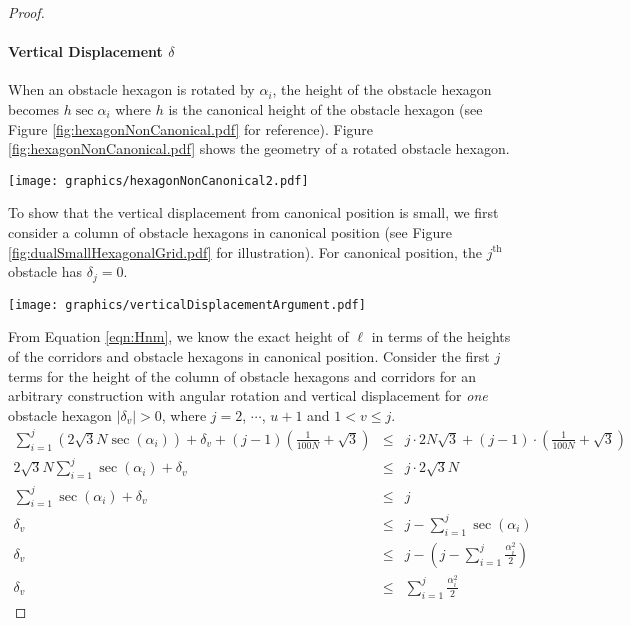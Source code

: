\documentclass[10pt]{CSUNthesis}
\theoremstyle{plain}%
\theoremstyle{definition}
\theoremstyle{remark}
\newcommand{\jth}{j^\text{th}}
\newcommand{\lr}[1]{\left( #1 \right)}
\begin{document}
\begin{proof}
\paragraph{Vertical Displacement $\delta$}

When an obstacle hexagon is rotated by $\alpha_i$, the height of the obstacle hexagon becomes $h \sec \alpha_i$ where $h$ is the canonical height of the obstacle hexagon (see Figure \ref{fig:hexagonNonCanonical.pdf} for reference).
Figure \ref{fig:hexagonNonCanonical.pdf} shows the geometry of a rotated obstacle hexagon.

\begin{minipage}{\linewidth}
\begin{center}
\texttt{[image: graphics/hexagonNonCanonical2.pdf]}
\label{fig:hexagonNonCanonical.pdf}
\end{center}
\end{minipage}

To show that the vertical displacement from canonical position is small, we first consider a column of obstacle hexagons in canonical position (see Figure \ref{fig:dualSmallHexagonalGrid.pdf} for illustration).  
For canonical position, the $\jth$ obstacle has $\delta_j = 0$.

\begin{minipage}{\linewidth}
\begin{center}
\texttt{[image: graphics/verticalDisplacementArgument.pdf]}
\label{fig:verticalDisplacementArgument.pdf}
\end{center}
\end{minipage}

From Equation \ref{eqn:Hnm}, we know the exact height of $\ell$ in terms of the heights of the corridors and obstacle hexagons in canonical position.  
Consider the first $j$ terms for the height of the column of obstacle hexagons and corridors for an arbitrary construction with angular rotation and vertical displacement for \textit{one} obstacle hexagon $\vert \delta_v \vert > 0$, where $j=2$, $\cdots$, $u+1$ and $1 < v \leq j$.
\begin{eqnarray*}
\sum_{i=1}^j \lr{2 \sqrt{3} N \sec \lr{ \alpha_i}} + \delta_v  + (j-1) \lr{\frac{1}{100N}+\sqrt{3}} &\leq& j \cdot 2 N \sqrt{3} + (j-1) \cdot \lr{\frac{1}{100N}+\sqrt{3}}\\
2 \sqrt{3} N \sum_{i=1}^j \sec \lr{\alpha_i} + \delta_ v &\leq& j \cdot 2 \sqrt{3} N \\
\sum_{i=1}^j \sec \lr{\alpha_i} + \delta_v &\leq& j\\
 \delta_v &\leq& j- \sum_{i=1}^j \sec \lr{\alpha_i}\\
 \delta_v &\leq& j - \lr{j - \sum_{i=1}^j \frac{\alpha_i^2}{2}}\\
\delta_v &\leq&  \sum_{i=1}^j \frac{\alpha_i^2}{2}
\end{eqnarray*}


\end{proof}
\end{document}
